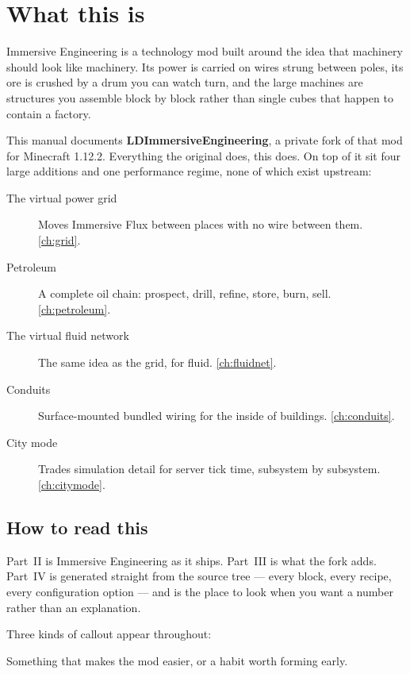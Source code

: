 \chapter{What this is}
\label{ch:introduction}

Immersive Engineering is a technology mod built around the idea that machinery should look like
machinery. Its power is carried on wires strung between poles, its ore is crushed by a drum you can
watch turn, and the large machines are structures you assemble block by block rather than single
cubes that happen to contain a factory.

This manual documents \textbf{LDImmersiveEngineering}, a private fork of that mod for Minecraft
1.12.2. Everything the original does, this does. On top of it sit four large additions and one
performance regime, none of which exist upstream:

\begin{description}
\item[The virtual power grid] Moves Immersive Flux between places with no wire between them.
      \autoref{ch:grid}.
\item[Petroleum] A complete oil chain: prospect, drill, refine, store, burn, sell.
      \autoref{ch:petroleum}.
\item[The virtual fluid network] The same idea as the grid, for fluid. \autoref{ch:fluidnet}.
\item[Conduits] Surface-mounted bundled wiring for the inside of buildings. \autoref{ch:conduits}.
\item[City mode] Trades simulation detail for server tick time, subsystem by subsystem.
      \autoref{ch:citymode}.
\end{description}

\section{How to read this}

Part~II is Immersive Engineering as it ships. Part~III is what the fork adds. Part~IV is generated
straight from the source tree --- every block, every recipe, every configuration option --- and is
the place to look when you want a number rather than an explanation.

Three kinds of callout appear throughout:

\begin{ietip}
Something that makes the mod easier, or a habit worth forming early.
\end{ietip}

